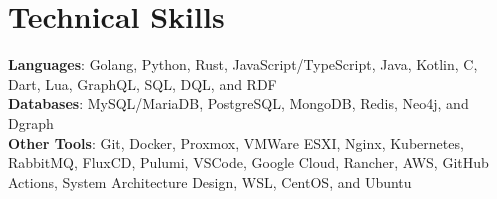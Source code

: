 \documentclass[letterpaper,11pt]{article}
\begin{document}
\section{Technical Skills}
 \begin{itemize}[leftmargin=0.15in, label={}]
    \small{\item{
     \textbf{Languages}{: Golang, Python, Rust, JavaScript/TypeScript, Java, Kotlin, C, Dart, Lua, GraphQL, SQL, DQL, and RDF} \\
     \textbf{Databases}{: MySQL/MariaDB, PostgreSQL, MongoDB, Redis, Neo4j, and Dgraph} \\
     \textbf{Other Tools}{: Git, Docker, Proxmox, VMWare ESXI, Nginx, Kubernetes, RabbitMQ, FluxCD, Pulumi, VSCode, Google Cloud, Rancher, AWS, GitHub Actions, System Architecture Design, WSL, CentOS, and Ubuntu} \\
    }}
 \end{itemize}


\end{document}

